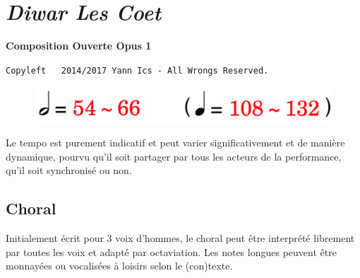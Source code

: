 \newpage
{}
{}
\thispagestyle{empty}

\section*{\textsl{Diwar Les Coet}}
\label{dlcscore}

\begin{center} 
\textbf{Composition Ouverte Opus 1}

{\scriptsize  \texttt{Copyleft \textcopyleft \, 2014/2017 Yann Ics - All Wrongs Reserved.}}
 \end{center} 
 \begin{figure}[H]
\includegraphics[scale=0.1]{img/dlct}
\end{figure}
 
 Le tempo est purement indicatif et peut varier significativement et de mani\`{e}re dynamique, pourvu qu'il soit partager par tous les acteurs de la performance, qu'il soit synchronis\'{e} ou non.

\subsection*{Choral}

Initialement \'{e}crit pour 3 voix d'hommes, le choral peut \^{e}tre interpr\'{e}t\'{e} librement par toutes les voix et adapt\'{e} par octaviation. Les notes longues peuvent \^{e}tre monnay\'{e}es ou vocalis\'{e}es \`{a} loisirs selon le (con)texte. 

